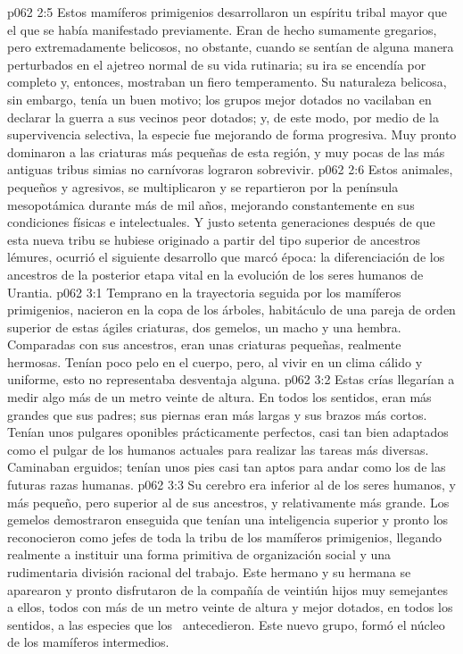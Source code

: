 \vs p062 2:5 Estos mamíferos primigenios desarrollaron un espíritu tribal mayor que el que se había manifestado previamente. Eran de hecho sumamente gregarios, pero extremadamente belicosos, no obstante, cuando se sentían de alguna manera perturbados en el ajetreo normal de su vida rutinaria; su ira se encendía por completo y, entonces, mostraban un fiero temperamento. Su naturaleza belicosa, sin embargo, tenía un buen motivo; los grupos mejor dotados no vacilaban en declarar la guerra a sus vecinos peor dotados; y, de este modo, por medio de la supervivencia selectiva, la especie fue mejorando de forma progresiva. Muy pronto dominaron a las criaturas más pequeñas de esta región, y muy pocas de las más antiguas tribus simias no carnívoras lograron sobrevivir.
\vs p062 2:6 Estos animales, pequeños y agresivos, se multiplicaron y se repartieron por la península mesopotámica durante más de mil años, mejorando constantemente en sus condiciones físicas e intelectuales. Y justo setenta generaciones después de que esta nueva tribu se hubiese originado a partir del tipo superior de ancestros lémures, ocurrió el siguiente desarrollo que marcó época: la  diferenciación de los ancestros de la posterior etapa vital en la evolución de los seres humanos de Urantia.
\vs p062 3:1 Temprano en la trayectoria seguida por los mamíferos primigenios, nacieron en la copa de los árboles, habitáculo de una pareja de orden superior de estas ágiles criaturas, dos gemelos, un macho y una hembra. Comparadas con sus ancestros, eran unas criaturas pequeñas, realmente hermosas. Tenían poco pelo en el cuerpo, pero, al vivir en un clima cálido y uniforme, esto no representaba desventaja alguna.
\vs p062 3:2 Estas crías llegarían a medir algo más de un metro veinte de altura. En todos los sentidos, eran más grandes que sus padres; sus piernas eran más largas y sus brazos más cortos. Tenían unos pulgares oponibles prácticamente perfectos, casi tan bien adaptados como el pulgar de los humanos actuales para realizar las tareas más diversas. Caminaban erguidos; tenían unos pies casi tan aptos para andar como los de las futuras razas humanas.
\vs p062 3:3 Su cerebro era inferior al de los seres humanos, y más pequeño, pero superior al de sus ancestros, y relativamente más grande. Los gemelos demostraron enseguida que tenían una inteligencia superior y pronto los reconocieron como jefes de toda la tribu de los mamíferos primigenios, llegando realmente a instituir una forma primitiva de organización social y una rudimentaria división racional del trabajo. Este hermano y su hermana se aparearon y pronto disfrutaron de la compañía de veintiún hijos muy semejantes a ellos, todos con más de un metro veinte de altura y mejor dotados, en todos los sentidos, a las especies que los  antecedieron. Este nuevo grupo, formó el núcleo de los mamíferos intermedios.
